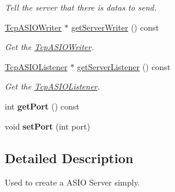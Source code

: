 \begin{DoxyCompactItemize}
\begin{DoxyCompactList}\small\item\em Tell the server that there is datas to send. \end{DoxyCompactList}\item 
\hyperlink{classmognetwork_1_1_tcp_a_s_i_o_writer}{Tcp\-A\-S\-I\-O\-Writer} $\ast$ \hyperlink{classmognetwork_1_1_tcp_a_s_i_o_server_a55e84839aad1572d36a0c7fcbc1fd84d}{get\-Server\-Writer} () const 
\begin{DoxyCompactList}\small\item\em Get the \hyperlink{classmognetwork_1_1_tcp_a_s_i_o_writer}{Tcp\-A\-S\-I\-O\-Writer}. \end{DoxyCompactList}\item 
\hyperlink{classmognetwork_1_1_tcp_a_s_i_o_listener}{Tcp\-A\-S\-I\-O\-Listener} $\ast$ \hyperlink{classmognetwork_1_1_tcp_a_s_i_o_server_afb30f505e64de27887abec2e8cfd50ff}{get\-Server\-Listener} () const 
\begin{DoxyCompactList}\small\item\em Get the \hyperlink{classmognetwork_1_1_tcp_a_s_i_o_listener}{Tcp\-A\-S\-I\-O\-Listener}. \end{DoxyCompactList}\item 
\hypertarget{classmognetwork_1_1_tcp_a_s_i_o_server_a2f16d1d17fa0924ae3374b5a0b2ddbb9}{int {\bfseries get\-Port} () const }\label{classmognetwork_1_1_tcp_a_s_i_o_server_a2f16d1d17fa0924ae3374b5a0b2ddbb9}

\item 
\hypertarget{classmognetwork_1_1_tcp_a_s_i_o_server_a6755dc52554538e1e949520842331843}{void {\bfseries set\-Port} (int port)}\label{classmognetwork_1_1_tcp_a_s_i_o_server_a6755dc52554538e1e949520842331843}

\end{DoxyCompactItemize}


\subsection{Detailed Description}
Used to create a A\-S\-I\-O Server simply. 

